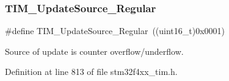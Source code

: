 \subsubsection{\texorpdfstring{T\+I\+M\+\_\+\+Update\+Source\+\_\+\+Regular}{TIM\_UpdateSource\_Regular}}
{\footnotesize\ttfamily \#define T\+I\+M\+\_\+\+Update\+Source\+\_\+\+Regular~((uint16\+\_\+t)0x0001)}

Source of update is counter overflow/underflow. 

Definition at line 813 of file stm32f4xx\+\_\+tim.\+h.

